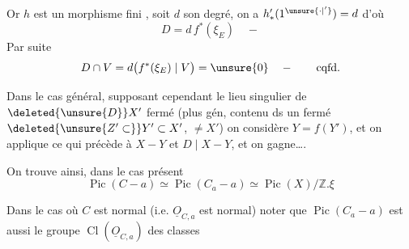 Or $h$ est un morphisme fini , soit $d$ son  degré, on a $h'_*(1^{\unsure{\cdot|'}})=d$ d'où
\[
D=d\,f^*(\xi_E)\quad -
\]
Par suite
\[
D\cap V=d\bigl(f^*(\xi_E)\mid V\bigr)=\unsure{0}\quad-\qquad\text{cqfd.}
\]

Dans le cas général, supposant cependant le lieu singulier de $\deleted{\unsure{D}}X'$ fermé (plus gén, contenu ds un  fermé $\deleted{\unsure{Z'\subset}}Y'\subset X'$, $\ne X'$) on considère $Y=f(Y')$, et on applique ce qui précède à $X-Y$ et $D\mid X-Y$, et on gagne\ldots.

On trouve ainsi, dans le cas présent
\[
\boxed{\operatorname{Pic}(C-a)\simeq\operatorname{Pic}(C_a-a)\simeq\operatorname{Pic}(X)/\mathbb Z.\xi}
\]

Dans le cas où $C$ est normal (i.e.  $\underline O_{C,a}$ est normal) noter que $\operatorname{Pic}(C_a-a)$ est aussi le groupe $\operatorname{Cl}(\underline O_{C,a})$ des classes
